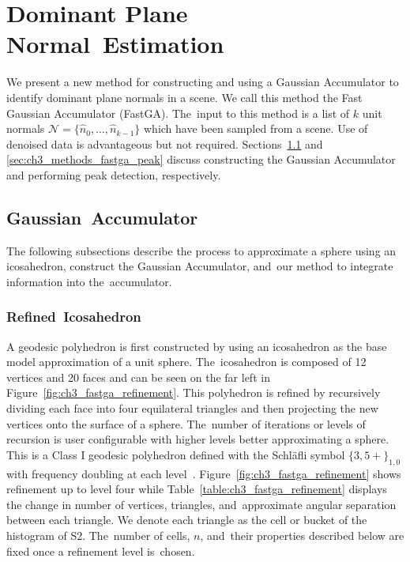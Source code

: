 \section{Dominant Plane Normal~Estimation}\label{sec:ch3_methods_fastga}

We present a new method for constructing and using a Gaussian Accumulator to identify dominant plane normals in a scene. We call this method the Fast Gaussian Accumulator (FastGA). The~input to this method is a list of $k$ unit normals $\mathcal{N} = \{\hat{n}_0, \ldots, \hat{n}_{k-1} \}$ which have been sampled from a scene. Use of denoised data is advantageous but not required. Sections~\ref{sec:ch3_methods_fastga_histogram} and \ref{sec:ch3_methods_fastga_peak} discuss constructing the Gaussian Accumulator and performing peak detection, respectively. 

\subsection{Gaussian~Accumulator}\label{sec:ch3_methods_fastga_histogram}

The following subsections describe the process to approximate a sphere using an icosahedron, construct the Gaussian Accumulator, and~our method to integrate information into the~accumulator. 

\subsubsection{Refined~Icosahedron}\label{sec:ch3_methods_fastga_ico}

A geodesic polyhedron is first constructed by using an icosahedron as the base model approximation of a unit sphere. The~icosahedron is composed of 12 vertices and 20 faces and can be seen on the far left in Figure~\ref{fig:ch3_fastga_refinement}. This polyhedron is refined by recursively dividing each face into four equilateral triangles and then projecting the new vertices onto the surface of a sphere. The~number of iterations or levels of recursion is user configurable with higher levels better approximating a sphere. This is a Class I geodesic polyhedron defined with the Schläfli symbol $\{3,5+\}_{1,0}$ with frequency doubling at each level~\cite{wenninger_spherical_1999}. Figure~\ref{fig:ch3_fastga_refinement} shows refinement up to level four while Table~\ref{table:ch3_fastga_refinement} displays the change in number of vertices, triangles, and~approximate angular separation between each triangle. We denote each triangle as the cell or bucket of the histogram of S2. The~number of cells, $n$, and~their properties described below are  fixed once a refinement level is~chosen.


